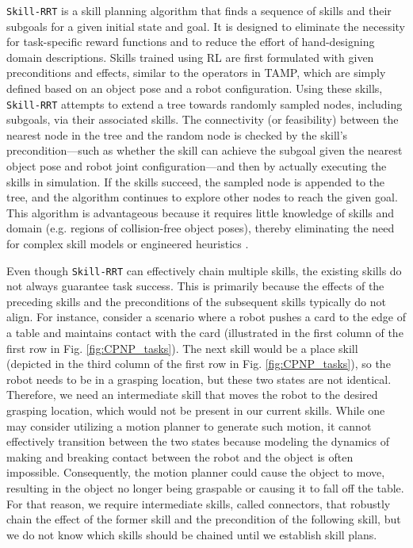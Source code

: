 \texttt{Skill-RRT} is a skill planning algorithm that finds a sequence of skills and their subgoals for a given initial state and goal. It is designed to eliminate the necessity for task-specific reward functions and to reduce the effort of hand-designing domain descriptions. Skills trained using RL are first formulated with given preconditions and effects, similar to the operators in TAMP, which are simply defined based on an object pose and a robot configuration. Using these skills, \texttt{Skill-RRT} attempts to extend a tree towards randomly sampled nodes, including subgoals, via their associated skills. The connectivity (or feasibility) between the nearest node in the tree and the random node is checked by the skill's precondition—such as whether the skill can achieve the subgoal given the nearest object pose and robot joint configuration—and then by actually executing the skills in simulation. If the skills succeed, the sampled node is appended to the tree, and the algorithm continues to explore other nodes to reach the given goal. This algorithm is advantageous because it requires little knowledge of skills and domain (e.g. regions of collision-free object poses), thereby eliminating the need for complex skill models \cite{liang2022search} or engineered heuristics \cite{barry2013hierarchical}.


Even though \texttt{Skill-RRT} can effectively chain multiple skills, the existing skills do not always guarantee task success. This is primarily because the effects of the preceding skills and the preconditions of the subsequent skills typically do not align. For instance, consider a scenario where a robot pushes a card to the edge of a table and maintains contact with the card (illustrated in the first column of the first row in Fig. \ref{fig:CPNP_tasks}). The next skill would be a place skill (depicted in the third column of the first row in Fig. \ref{fig:CPNP_tasks}), so the robot needs to be in a grasping location, but these two states are not identical. Therefore, we need an intermediate skill that moves the robot to the desired grasping location, which would not be present in our current skills. While one may consider utilizing a motion planner to generate such motion, it cannot effectively transition between the two states because modeling the dynamics of making and breaking contact between the robot and the object is often impossible. Consequently, the motion planner could cause the object to move, resulting in the object no longer being graspable or causing it to fall off the table. For that reason, we require intermediate skills, called connectors, that robustly chain the effect of the former skill and the precondition of the following skill, but we do not know which skills should be chained until we establish skill plans.


